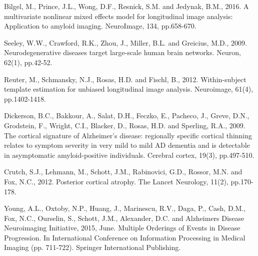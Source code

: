 \documentclass{llncs}
\begin{document}
\begin{thebibliography}{5}
Bilgel, M., Prince, J.L., Wong, D.F., Resnick, S.M. and Jedynak, B.M., 2016. A multivariate nonlinear mixed effects model for longitudinal image analysis: Application to amyloid imaging. NeuroImage, 134, pp.658-670.

Seeley, W.W., Crawford, R.K., Zhou, J., Miller, B.L. and Greicius, M.D., 2009. Neurodegenerative diseases target large-scale human brain networks. Neuron, 62(1), pp.42-52.


Reuter, M., Schmansky, N.J., Rosas, H.D. and Fischl, B., 2012. Within-subject template estimation for unbiased longitudinal image analysis. Neuroimage, 61(4), pp.1402-1418.


Dickerson, B.C., Bakkour, A., Salat, D.H., Feczko, E., Pacheco, J., Greve, D.N., Grodstein, F., Wright, C.I., Blacker, D., Rosas, H.D. and Sperling, R.A., 2009. The cortical signature of Alzheimer's disease: regionally specific cortical thinning relates to symptom severity in very mild to mild AD dementia and is detectable in asymptomatic amyloid-positive individuals. Cerebral cortex, 19(3), pp.497-510.


Crutch, S.J., Lehmann, M., Schott, J.M., Rabinovici, G.D., Rossor, M.N. and Fox, N.C., 2012. Posterior cortical atrophy. The Lancet Neurology, 11(2), pp.170-178.

Young, A.L., Oxtoby, N.P., Huang, J., Marinescu, R.V., Daga, P., Cash, D.M., Fox, N.C., Ourselin, S., Schott, J.M., Alexander, D.C. and Alzheimers Disease Neuroimaging Initiative, 2015, June. Multiple Orderings of Events in Disease Progression. In International Conference on Information Processing in Medical Imaging (pp. 711-722). Springer International Publishing.

\end{thebibliography}

\clearpage
\end{document}
